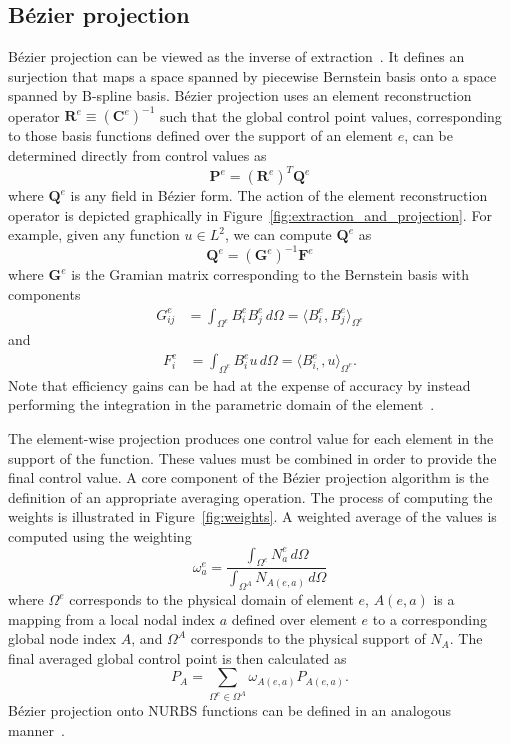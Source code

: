 \subsection{B\'ezier projection}
\label{sec:bproject}

B\'{e}zier projection can be viewed as the inverse of extraction~\cite{thomas_bezier_2015}. It defines an surjection that maps a space spanned by  piecewise Bernstein basis onto a space spanned by B-spline basis. B\'ezier projection uses an element reconstruction operator $\mathbf{R}^e\equiv(\mathbf{C}^e)^{-1}$ such that the global control point values, corresponding to those basis functions defined over the support of an element $e$, can be determined directly from \Bezier control values as
\begin{equation}
    \mathbf{P}^e=(\mathbf{R}^e)^T\mathbf{Q}^e
\end{equation}
where $\mathbf{Q}^e$ is any field in B\'ezier form. The action of the element reconstruction operator is depicted graphically in Figure~\ref{fig:extraction_and_projection}. For example, given any function $u \in L^2$, we can compute $\mathbf{Q}^e$ as
\begin{equation}
    \mathbf{Q}^e=(\mathbf{G}^e)^{-1}\mathbf{F}^e
    \label{eq:element-Qi}
\end{equation}
where $\mathbf{G}^e$ is the Gramian matrix corresponding to the Bernstein basis with components
\begin{align}
    {G}_{ij}^e & = \int_{\Omega^e} B^e_i B^e_j \, d\Omega =\langle{B^e_{i},B^e_{j}}\rangle_{\Omega^e}\label{eq:element_gramian}
\end{align}
and
\begin{align}
    {F}^e_i & =  \int_{\Omega^e} B^e_i u \, d\Omega = \langle{B^e_{i,},u}\rangle_{\Omega^e}.
\end{align}
Note that efficiency gains can be had at the expense of accuracy by instead performing the integration in the parametric domain of the element~\cite{thomas_bezier_2015}.

The element-wise projection produces one control value for each element in the support of the function.  These values must be combined in order to provide the final control value.  A core component of the B\'ezier projection algorithm is the definition of an appropriate averaging operation. The process of computing the weights is illustrated in Figure~\ref{fig:weights}. A weighted average of the values is computed using the weighting
\begin{equation}\label{eq:Bezier_weight}
    \omega_a^e=\dfrac{\int_{\Omega^e} N_{a}^e \, d\Omega}{\int_{\Omega^A} N_{A(e,a)} \, d\Omega}
\end{equation}
where $\Omega^e$ corresponds to the physical domain of element $e$, $A(e,a)$ is a mapping from a local nodal index $a$ defined over element $e$ to a corresponding global node index $A$, and $\Omega^A$ corresponds to the physical support of $N_A$. The final averaged global control point is then calculated as
\begin{equation}
    P_A=\sum_{\Omega^e\in \Omega^A } \omega_{A(e,a)} P_{A(e,a)}.
\end{equation}
B\'ezier projection onto NURBS functions can be defined in an analogous manner~\cite{thomas_bezier_2015}.

